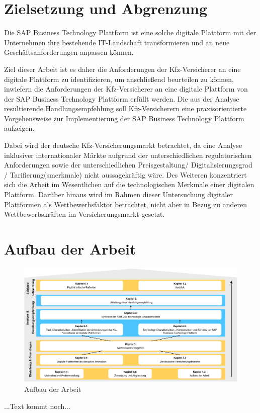 \section{Zielsetzung und Abgrenzung}

Die SAP Business Technology Plattform ist eine solche digitale Plattform mit der Unternehmen ihre bestehende IT-Landschaft transformieren und an neue Geschäftsanforderungen anpassen können. 

Ziel dieser Arbeit ist es daher die Anforderungen der Kfz-Versicherer an eine digitale Plattform zu identifizieren, um anschließend beurteilen zu können, inwiefern die Anforderungen der Kfz-Versicherer an eine digitale Plattform von der SAP Business Technology Plattform erfüllt werden. Die aus der Analyse resultierende Handlungsempfehlung soll Kfz-Versicherern eine praxisorientierte Vorgehensweise zur Implementierung der SAP Business Technology Plattform aufzeigen.

Dabei wird der deutsche Kfz-Versicherungsmarkt betrachtet, da eine Analyse inklusiver internationaler Märkte aufgrund der unterschiedlichen regulatorischen Anforderungen sowie der unterschiedlichen Preisgestaltung/ Digitalisierungsgrad / Tarifierung(smerkmale)  nicht aussagekräftig wäre. Des Weiteren konzentriert sich die Arbeit im Wesentlichen auf die technologischen Merkmale einer digitalen Plattform. Darüber hinaus wird im Rahmen dieser Untersuchung digitaler Plattformen als Wettbewerbsfaktor betrachtet, nicht aber in Bezug zu anderen Wettbewerbskräften im Versicherungsmarkt gesetzt.

\newpage
\section{Aufbau der Arbeit}

\begin{figure}[h]
    \centering
    \includegraphics[width=1\textwidth]{img/Aufbau_der_Arbeit.jpg}
    \caption[Aufbau der Arbeit]{Aufbau der Arbeit\autocite{Aufbau}}
    \label{fig:Aufbau}
\end{figure}


...Text kommt noch...

\newpage